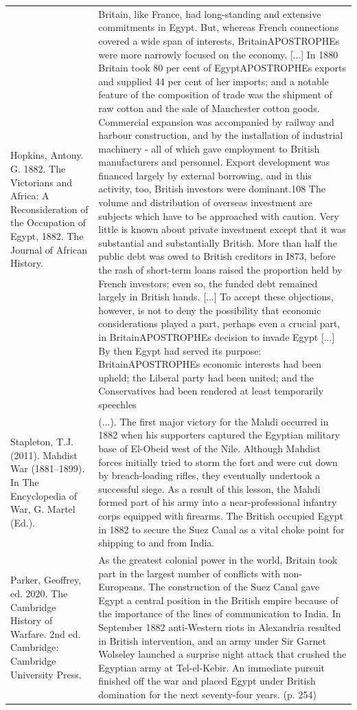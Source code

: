 {\begin{longtable}{p{}p{}}
Hopkins, Antony. G. 1882. The Victorians and Africa: A Reconsideration of the Occupation of Egypt, 1882. The Journal of African History. & Britain, like France, had long-standing and extensive commitments in Egypt. But, whereas French connections covered a wide span of interests, BritainAPOSTROPHEs were more narrowly focused on the economy. [...] In 1880 Britain took 80 per cent of EgyptAPOSTROPHEs exports and supplied 44 per cent of her imports; and a notable feature of the composition of trade was the shipment of raw cotton and the sale of Manchester cotton goods. Commercial expansion was accompanied by railway and harbour construction, and by the installation of industrial machinery - all of which gave employment to British manufacturers and personnel. Export development was financed largely by external borrowing, and in this activity, too, British investors were dominant.108 The volume and distribution of overseas investment are subjects which have to be approached with caution. Very little is known about private investment except that it was substantial and substantially British. More than half the public debt was owed to British creditors in I873, before the rash of short-term loans raised the proportion held by French investors; even so, the funded debt remained largely in British hands. [...] To accept these objections, however, is not to deny the possibility that economic considerations played a part, perhaps even a crucial part, in BritainAPOSTROPHEs decision to invade Egypt [...] By then Egypt had served its purpose: BritainAPOSTROPHEs economic interests had been upheld; the Liberal party had been united; and the Conservatives had been rendered at least temporarily speechles
\\
Stapleton, T.J. (2011). Mahdist War (1881–1899). In The Encyclopedia of War, G. Martel (Ed.). & (...). The first major victory for the Mahdi occurred in 1882 when his supporters captured the Egyptian military base of El-Obeid west of the Nile. Although Mahdist forces initially tried to storm the fort and were cut down by breach-loading rifles, they eventually undertook a successful siege. As a result of this lesson, the Mahdi formed part of his army into a near-professional infantry corps equipped with firearms. The British occupied Egypt in 1882 to secure the Suez Canal as a vital choke point for shipping to and from India.
\\
Parker, Geoffrey, ed. 2020. The Cambridge History of Warfare. 2nd ed. Cambridge: Cambridge University Press. & As the greatest colonial power in the world, Britain took part in the largest number of conflicts with non-Europeans. The construction of the Suez Canal gave Egypt a central position in the British empire because of the importance of the lines of communication to India. In September 1882 anti-Western riots in Alexandria resulted in British intervention, and an army under Sir Garnet Wolseley launched a surprise night attack that crushed the Egyptian army at Tel-el-Kebir. An immediate pursuit finished off the war and placed Egypt under British domination for the next seventy-four years. (p. 254)

\end{longtable}}
